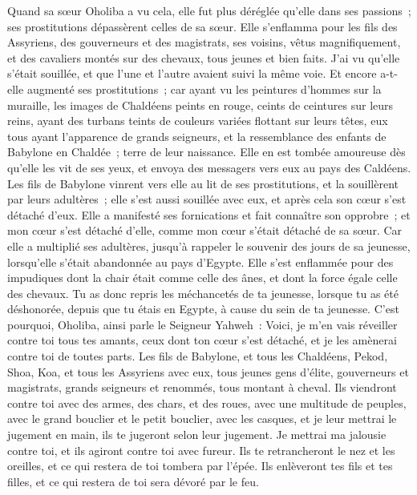 \begin{multicols}{2}
Quand sa sœur Oholiba a vu cela, elle fut plus déréglée qu'elle dans ses passions~; ses prostitutions dépassèrent celles de sa sœur.
Elle s'enflamma pour les fils des Assyriens, des gouverneurs et des magistrats, ses voisins, vêtus magnifiquement, et des cavaliers montés sur des chevaux, tous jeunes et bien faits.
J'ai vu qu'elle s'était souillée, et que l'une et l'autre avaient suivi la même voie.
 Et encore a-t-elle augmenté ses prostitutions~; car ayant vu les peintures d'hommes sur la muraille, les images de Chaldéens peints en rouge,
ceints de ceintures sur leurs reins, ayant des turbans teints de couleurs variées flottant sur leurs têtes, eux tous ayant l'apparence de grands seigneurs, et la ressemblance des enfants de Babylone en Chaldée~; terre de leur naissance.
Elle en est tombée amoureuse dès qu'elle les vit de ses yeux, et envoya des messagers vers eux au pays des Caldéens. 
Les fils de Babylone vinrent vers elle au lit de ses prostitutions, et la souillèrent par leurs adultères~; elle s'est aussi souillée avec eux, et après cela son cœur s'est détaché d'eux.
Elle a manifesté ses fornications et fait connaître son opprobre~; et mon cœur s'est détaché d'elle, comme mon cœur s'était détaché de sa sœur.
Car elle a multiplié ses adultères, jusqu'à rappeler le souvenir des jours de sa jeunesse, lorsqu'elle s'était abandonnée au pays d'Egypte.
Elle s'est enflammée pour des impudiques dont la chair était comme celle des ânes, et dont la force égale celle des chevaux.
Tu as donc repris les méchancetés de ta jeunesse, lorsque tu as été déshonorée, depuis que tu étais en Egypte, à cause du sein de ta jeunesse.
C'est pourquoi, Oholiba, ainsi parle le Seigneur Yahweh~: Voici, je m'en vais réveiller contre toi tous tes amants, ceux dont ton cœur s'est détaché, et je les amènerai contre toi de toutes parts.
Les fils de Babylone, et tous les Chaldéens, Pekod, Shoa, Koa, et tous les Assyriens avec eux, tous jeunes gens d'élite, gouverneurs et magistrats, grands seigneurs et renommés, tous montant à cheval.
Ils viendront contre toi avec des armes, des chars, et des roues, avec une multitude de peuples, avec le grand bouclier et le petit bouclier, avec les casques, et je leur mettrai le jugement en main, ils te jugeront selon leur jugement.
Je mettrai ma jalousie contre toi, et ils agiront contre toi avec fureur. Ils te retrancheront le nez et les oreilles, et ce qui restera de toi tombera par l'épée. Ils enlèveront tes fils et tes filles, et ce qui restera de toi sera dévoré par le feu.

\end{multicols}
